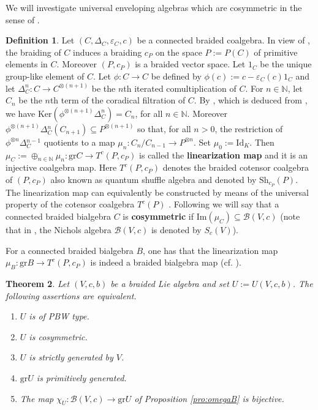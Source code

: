 \documentclass[english]{amsart}
\numberwithin{equation}{section}
\numberwithin{figure}{section}
\theoremstyle{plain}
\newtheorem{thm}{Theorem}[section]
\theoremstyle{definition}
\newtheorem{defn}[thm]{Definition}
\theoremstyle{definition}
\theoremstyle{remark}
\theoremstyle{remark}
\theoremstyle{plain}
\theoremstyle{plain}
\theoremstyle{plain}
\begin{document}
We will investigate universal enveloping algebras which are cosymmetric
in the sense of \cite[Definition 3.1]{Kharchenko- connected}.
\begin{defn}
Let $\left(C,\Delta{}_{C},\varepsilon{}_{C},c\right)$ be a connected
braided coalgebra. In view of \cite[Remark 1.12]{AMS-MM2}, the braiding
of $C$ induces a braiding $c_{P}$ on the space $P:=P\left(C\right)$
of primitive elements in $C$. Moreover $\left(P,c_{P}\right)$ is
a braided vector space. Let $1_{C}$ be the unique group-like element
of $C.$ Let $\phi:C\rightarrow C$ be defined by $\phi\left(c\right):=c-\varepsilon_{C}\left(c\right)1_{C}$
and let $\Delta_{C}^{n}:C\rightarrow C^{\otimes (n+1)}$ be the $n$th
iterated comultiplication of $C$. For $n\in \mathbb{N}$, let $C_{n}$ be the $n$th term
of the coradical filtration of $C$. By \cite[Lemma 2.2]{Kharchenko- connected}, which is deduced from \cite[Proposition 11.0.5]{Sw},
we have $\mathrm{Ker}(\phi^{\otimes (n+1)}\Delta_{C}^{n})=C_{n}$,
for all $n\in\mathbb{N}$. Moreover $\phi^{\otimes (n+1)}\Delta{}_{C}^{n}\left(C_{n+1}\right)\subseteq P^{\otimes (n+1)}$
so that, for all $n>0$, the restriction of $\phi^{\otimes n}\Delta{}_{C}^{n-1}$
quotients to a map $\mu_{n}:C_{n}/C_{n-1}\rightarrow P^{\otimes n}$.
Set $\mu_{0}:=\mathrm{Id}_{K}$. Then $\mu_{C}:=\oplus_{n\in\mathbb{N}}\mu_{n}:\mathrm{gr}C\rightarrow T^{c}\left(P,c_{P}\right)$
is called the \textbf{linearization map} and it is an injective coalgebra
map. Here $T^{c}\left(P,c_{P}\right)$ denotes the braided cotensor
coalgebra of $(P,c_{P})$ also known as quantum shuffle algebra and
denoted by $\mathrm{Sh}_{c_{P}}(P)$. The linearization map can equivalently
be constructed by means of the universal property of the cotensor
coalgebra $T^{c}\left(P\right)$ \cite[Proposition 12.1.1]{Sw}. Following
\cite[Definition 3.1]{Kharchenko- connected} we will say that a connected
braided bialgebra $C$ is \textbf{cosymmetric} if $\mathrm{Im}\left(\mu_{C}\right)\subseteq\mathcal{B}\left(V,c\right)$
(note that in \cite{Kharchenko- connected}, the Nichols algebra $\mathcal{B}\left(V,c\right)$
is denoted by $S_{c}(V)$). 
{}

For a connected braided bialgebra $B$, one has that the linearization
map $\mu_{B}:\mathrm{gr}B\rightarrow T^{c}\left(P,c_{P}\right)$ is
indeed a braided bialgebra map (cf. \cite[Proposition 3.3]{Kharchenko- connected}).\end{defn}
\begin{thm}
\label{teo:PBW}Let $\left(V,c,b\right)$ be a braided Lie algebra
and set $U:=U(V,c,b)$. The following assertions are equivalent.
\begin{enumerate}
\item $U$ is of PBW type.
\item $U$ is cosymmetric.
\item $U$ is strictly generated by $V$.
\item $\mathrm{gr}U$ is primitively generated.
\item The map $\chi_{U}:\mathcal{B}\left(V,c\right)\rightarrow\mathrm{gr}U$
of Proposition \ref{pro:omegaB} is bijective.
\end{enumerate}
\end{thm}
\end{document}

